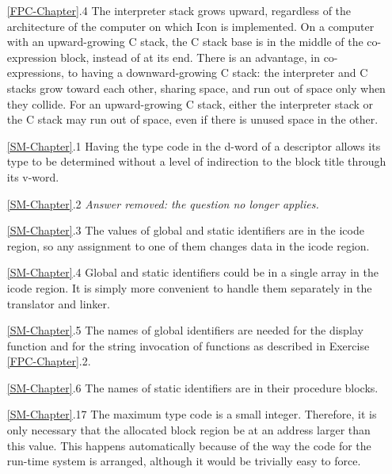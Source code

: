 \begin{itemize}
\goodbreak\item[\ref*{FPC-Chapter}.4]
The interpreter stack grows upward, regardless of the architecture of the
computer on which Icon is implemented. On a computer with an
upward-growing C stack, the C stack base is in the middle of the co-expression
block, instead of at its end. There is an advantage, in co-expressions,
to having a downward-growing C stack: the interpreter and
C stacks grow toward each other, sharing space, and run out of space only
when they collide. For an upward-growing C stack, either the interpreter
stack or the C stack may run out of space, even if there is unused space in
the other.

\goodbreak\item[\ref*{SM-Chapter}.1]
Having the type code in the d-word of a descriptor allows its type to be
determined without a level of indirection to the block title through its v-word.

\goodbreak\item[\ref*{SM-Chapter}.2]
{\em Answer removed: the question no longer applies.}

\goodbreak\item[\ref*{SM-Chapter}.3]
The values of global and static identifiers are in the icode region, so any
assignment to one of them changes data in the icode region.

\goodbreak\item[\ref*{SM-Chapter}.4]
Global and static identifiers could be in a single array in the icode region.
It is simply more convenient to handle them separately in the translator
and linker.

\goodbreak\item[\ref*{SM-Chapter}.5]
The names of global identifiers are needed for the display function and for
the string invocation of functions as described in Exercise \ref*{FPC-Chapter}.2.

\goodbreak\item[\ref*{SM-Chapter}.6]
The names of static identifiers are in their procedure blocks.

\goodbreak\item[\ref*{SM-Chapter}.17]
The maximum type code is a small integer. Therefore, it is only necessary
that the allocated block region be at an address larger than this value. This
happens automatically because of the way the code for the run-time system
is arranged, although it would be trivially easy to force.


\end{itemize}
